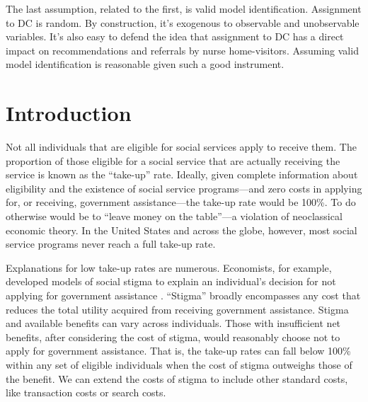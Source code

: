 \documentclass[12pt,letterpaperpaper,]{book}
\begin{document}
The last assumption, related to the first, is valid model
identification. Assignment to DC is random. By construction, it's
exogenous to observable and unobservable variables. It's also easy to
defend the idea that assignment to DC has a direct impact on
recommendations and referrals by nurse home-visitors. Assuming valid
model identification is reasonable given such a good instrument.

\section*{Introduction}\label{intro-2}

Not all individuals that are eligible for social services apply to
receive them. The proportion of those eligible for a social service that
are actually receiving the service is known as the ``take-up'' rate.
Ideally, given complete information about eligibility and the existence
of social service programs---and zero costs in applying for, or
receiving, government assistance---the take-up rate would be 100\%. To
do otherwise would be to ``leave money on the table''---a violation of
neoclassical economic theory. In the United States and across the globe,
however, most social service programs never reach a full take-up rate.

Explanations for low take-up rates are numerous. Economists, for
example, developed models of social stigma to explain an individual's
decision for not applying for government assistance
\citep{moffitt_economic_1983}. ``Stigma'' broadly encompasses any cost
that reduces the total utility acquired from receiving government
assistance. Stigma and available benefits can vary across individuals.
Those with insufficient net benefits, after considering the cost of
stigma, would reasonably choose not to apply for government assistance.
That is, the take-up rates can fall below 100\% within any set of
eligible individuals when the cost of stigma outweighs those of the
benefit. We can extend the costs of stigma to include other standard
costs, like transaction costs or search costs.
\end{document}
